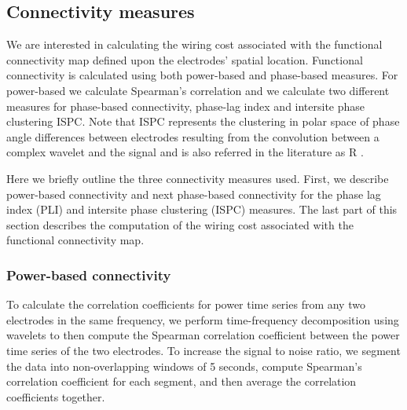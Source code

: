 \documentclass[11pt, onecolumn]{article}
\begin{document}
\subsection{Connectivity measures}
We are interested in calculating the wiring cost associated with the functional connectivity map defined upon the electrodes' spatial location. Functional connectivity is calculated using both power-based and phase-based measures. For power-based we calculate Spearman's correlation and we calculate two different measures for phase-based connectivity, phase-lag index \citep{stam2007phase} and intersite phase clustering ISPC. Note that ISPC represents the clustering in polar space of phase angle differences between electrodes resulting from the convolution between a complex wavelet and the signal and is also referred in the literature as R \citep{cohen2014analyzing}. 

Here we briefly outline the three connectivity measures used. First, we describe power-based connectivity and next phase-based connectivity for the phase lag index (PLI) and intersite phase clustering (ISPC) measures. The last part of this section describes the computation of the wiring cost associated with the functional connectivity map. 
\subsubsection{Power-based connectivity}
To calculate the correlation coefficients for power time series from any two electrodes in the same frequency, we perform time-frequency decomposition using wavelets to then compute the Spearman correlation coefficient between the power time series of the two electrodes. 
To increase the signal to noise ratio, we segment the data into non-overlapping windows of 5 seconds, compute Spearman's correlation coefficient for each segment, and then average the correlation coefficients together. %
\end{document}
